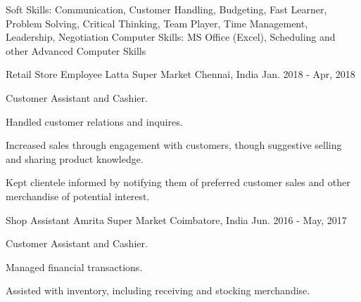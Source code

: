 \documentclass[12pt, a4paper]{awesome-cv}
\begin{document}
\makecvheader

\vspace{-1.5ex}
\begin{cventries}
\end{cventries}

\begin{cvskills}
    \cvskill
        {Soft Skills:}
        {Communication, Customer Handling, Budgeting, Fast Learner, Problem Solving, Critical Thinking, Team Player, Time Management, Leadership, Negotiation}
    \cvskill
        {Computer Skills:}
        {MS Office (Excel), Scheduling and other Advanced Computer Skills}
\end{cvskills}

\begin{cventries}
\cventry
    {Retail Store Employee}
    {Latta Super Market}
    {Chennai, India}
    {Jan. 2018 - Apr, 2018}
    {
      \begin{cvitems}
        \item {Customer Assistant and Cashier.}
        \item {Handled customer relations and inquires.}
        \item {Increased sales through engagement with customers, though suggestive selling and sharing product knowledge.}
        \item {Kept clientele informed by notifying them of preferred customer sales and other merchandise of potential interest.}
      \end{cvitems}
    }
\cventry
    {Shop Assistant}
    {Amrita Super Market}
    {Coimbatore, India}
    {Jun. 2016 - May, 2017}
    {
      \begin{cvitems}
        \item {Customer Assistant and Cashier.}
        \item {Managed financial transactions.}
        \item {Assisted with inventory, including receiving and stocking merchandise.}
      \end{cvitems}
    }
\end{cventries}
\end{document}
